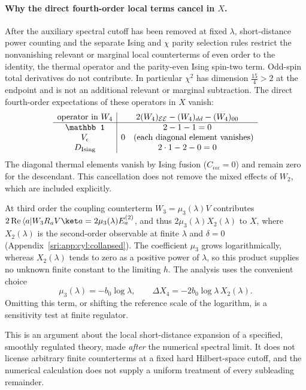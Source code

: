 \paragraph{Why the direct fourth-order local terms cancel in $X$.} After the auxiliary spectral cutoff has been removed
at fixed $\lambda$, short-distance power counting and the separate Ising and $\chi$ parity selection rules restrict the
nonvanishing relevant or marginal local counterterms of even order to the identity, the thermal operator and the
parity-even Ising spin-two term. Odd-spin total derivatives do not contribute. In particular $\chi^2$ has dimension
$\frac{15}{4}>2$ at the endpoint and is not an additional relevant or marginal subtraction. The direct fourth-order
expectations of these operators in $X$ vanish:
\begin{equation}
\begin{array}{c|c}
 \text{operator in }W_4 & 2(W_4)_{\mathcal E\mathcal E}-(W_4)_{dd}-(W_4)_{00}\\\hline
 \mathbb 1 & 2-1-1=0\\
 V_\epsilon & 0\quad\text{(each diagonal element vanishes)}\\
 D_{\rm Ising} & 2\cdot1-2-0=0
\end{array}
\label{sri:eq:cyl:W4}
\end{equation}
The diagonal thermal elements vanish by Ising fusion ($C_{\epsilon\epsilon\epsilon}=0$) and remain zero for the
descendant. This cancellation does not remove the mixed effects of $W_2$, which are included explicitly.

At third order the coupling counterterm $W_3=\mu_3(\lambda)V$ contributes
$2\,{\rm Re}\,\langle a\rvert W_3R_aV\ket a=2\mu_3(\lambda)E_a^{(2)}$, and thus $2\mu_3(\lambda)X_2(\lambda)$ to $X$,
where $X_2(\lambda)$ is the second-order observable at finite $\lambda$ and $\delta=0$
(Appendix~\ref{sri:app:cyl:collapsed}). The coefficient $\mu_3$ grows logarithmically, whereas $X_2(\lambda)$ tends to zero as a
positive power of $\lambda$, so this product supplies no unknown finite constant to the limiting $h$. The analysis uses
the convenient choice
\begin{equation}
 \mu_3(\lambda)=-b_0\log\lambda,\qquad \Delta X_4=-2b_0\log\lambda\,X_2(\lambda).
 \label{sri:eq:cyl:couplinglog}
\end{equation}
Omitting this term, or shifting the reference scale of the logarithm, is a sensitivity test at finite regulator.

This is an argument about the local short-distance expansion of a specified, smoothly regulated theory, made
\emph{after} the numerical spectral limit. It does not license arbitrary finite counterterms at a fixed hard
Hilbert-space cutoff, and the numerical calculation does not supply a uniform treatment of every subleading
remainder.

